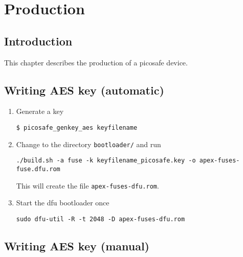 \chapter{Production}
\label{production}

\section{Introduction}

This chapter describes the production of a picosafe device.

\section{Writing AES key (automatic)}

\begin{enumerate}
\item Generate a key

\texttt{\$ picosafe\_genkey\_aes keyfilename}

\item Change to the directory \texttt{bootloader/} and run

\texttt{./build.sh -a fuse -k keyfilename\_picosafe.key -o apex-fuses-fuse.dfu.rom}

This will create the file \texttt{apex-fuses-dfu.rom}.

\item Start the dfu bootloader once

\texttt{sudo dfu-util -R -t 2048 -D apex-fuses-dfu.rom}
\end{enumerate}

\section{Writing AES key (manual)}

